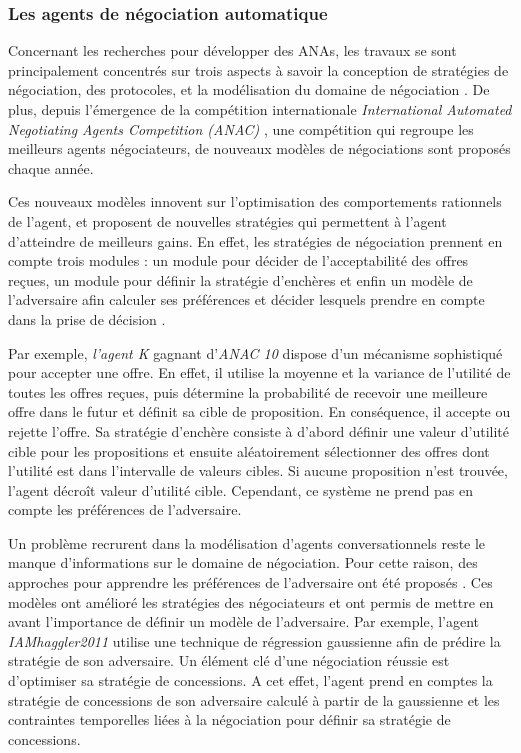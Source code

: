 			
	  \subsubsection{Les agents de négociation automatique}
	  
			Concernant les recherches pour développer des ANAs, les travaux se sont principalement concentrés sur trois aspects à savoir la conception de stratégies de négociation, des protocoles, et la modélisation du domaine de négociation \cite{jonker2012negotiating}. De plus, depuis l'émergence de la compétition internationale \emph{International Automated Negotiating Agents Competition (ANAC)} \cite{baarslag2012first,fujita2013second}, une compétition qui regroupe les meilleurs agents négociateurs, de nouveaux modèles de négociations sont proposés chaque année. 
			
			Ces nouveaux modèles innovent sur l'optimisation des comportements rationnels de l'agent, et proposent de nouvelles stratégies qui permettent à l'agent d'atteindre de meilleurs gains. 
			En effet, les stratégies de négociation prennent en compte trois modules : un module pour décider de l'acceptabilité des offres reçues, un module pour définir la stratégie d'enchères et enfin un modèle de l'adversaire afin calculer ses préférences et décider lesquels prendre en compte dans la prise de décision \cite{baarslag2014decoupling}.
			
			Par exemple, \textit{l'agent K} \cite{kawaguchi2011compromising} gagnant d'\emph{ANAC 10} dispose d'un mécanisme sophistiqué pour accepter une offre. En effet, il utilise la moyenne et la variance de l'utilité de toutes les offres reçues, puis détermine la probabilité de recevoir une meilleure offre dans le futur et définit sa cible de proposition. En conséquence, il accepte ou rejette l'offre. Sa stratégie d'enchère consiste à d'abord définir une valeur d'utilité cible pour les propositions et ensuite aléatoirement sélectionner des offres dont l'utilité est dans l'intervalle de valeurs cibles. Si aucune proposition n'est trouvée, l'agent décroît valeur d'utilité cible.	Cependant, ce système ne prend pas en compte les préférences de l'adversaire. 
			
			Un problème recrurent dans la modélisation d'agents conversationnels reste le manque d'informations sur le domaine de négociation. Pour cette raison, des approches pour apprendre les préférences de l'adversaire ont été proposés  \cite{williams2011using,jonker2012negotiating,frieder2013value,hindriks2008creating,hindriks2008opponent}. Ces modèles ont amélioré les stratégies des négociateurs et ont permis de mettre en avant l'importance de définir un modèle de l'adversaire. Par exemple, l'agent \textit{IAMhaggler2011} \cite{williams2011using} utilise une technique de régression gaussienne afin de prédire la stratégie de son adversaire. Un élément clé d'une négociation réussie est d'optimiser sa stratégie de concessions. A cet effet, l'agent prend en comptes la stratégie de concessions de son adversaire calculé à partir de la gaussienne et les contraintes temporelles liées à la négociation pour définir sa stratégie de concessions. 
			
